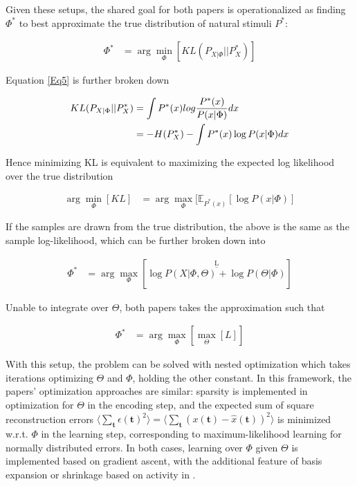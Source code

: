 \documentclass[
	a4paper, %
	11pt, %
	unnumberedsections, %
]{LTJournalArticle}
\begin{document}
 Given these setups, the shared goal for both papers is operationalized as finding $\Phi^*$ to best approximate the true distribution of natural stimuli $P^*$: 
 \begin{center}
  \begin{align}
    \Phi^* &= \arg\min_\Phi[KL(P_{X|\Phi}||P^*_{X})] \label{Eq5}
  \end{align}
 \end{center}
 Equation \eqref{Eq5} is further broken down
\begin{center}
  \begin{align}
    KL(P_{X|\Phi}||P^*_{X}) &= \int P^*(x)log\frac{P^*(x)}{P(x|\Phi)} dx\\
    & = -H(P^*_X)-\int P^*(x)\log P(x|\Phi) dx \notag  \end{align}
\end{center} 
Hence minimizing KL is equivalent to maximizing the expected log likelihood over the true distribution
\begin{center}
  \begin{align}
    \arg\min_\Phi[KL] &= \arg\max_\Phi[\mathbb{E}_{P^*(x)}[\log P(x|\Phi)]
  \end{align}
\end{center}
If the samples are drawn from the true distribution, the above is the same as the sample log-likelihood, which can be further broken down into
\begin{center}
  \begin{align}
    \Phi^* &= \arg\max_\Phi[\overset{\text{L}}{\overline{\log P(X|\Phi, \Theta) + \log P(\Theta|\Phi)}}]
  \end{align}
\end{center}
Unable to integrate over $\Theta$, both papers takes the approximation such that
\begin{center}
  \begin{align}
    \Phi^* &= \arg\max_\Phi[\max_{\Theta}[L]]
  \end{align}
\end{center}

With this setup, the problem can be solved with nested optimization which takes iterations optimizing $\Theta$ and $\Phi$, holding the other constant. In this framework, the papers' optimization approaches are similar: sparsity is implemented in optimization for $\Theta$ in the encoding step, and the expected sum of square reconstruction errors $\langle\sum_{\mathbf{t}} \epsilon(\mathbf{t})^2 \rangle=\langle \sum_{\mathbf{t}} (x(\mathbf{t}) - \hat{x}(\mathbf{t}))^2\rangle$ is minimized w.r.t. $\Phi$ in the learning step, corresponding to maximum-likelihood learning for normally distributed errors. In both cases, learning over $\Phi$ given $\Theta$ is implemented based on gradient ascent, with the additional feature of basis expansion or shrinkage based on activity in \textcite{smithEfficientAuditoryCoding2006}.\\
\end{document}
